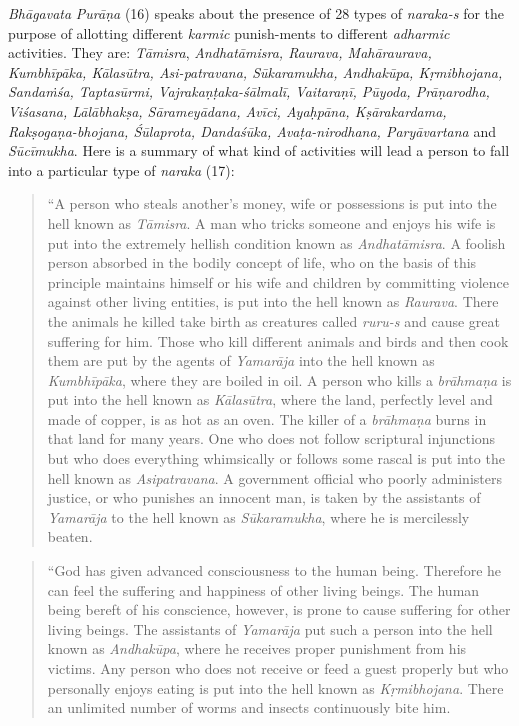\emph{Bhāgavata} \emph{Purāṇa} (16) speaks about the presence of 28 types of \emph{naraka-s} for the purpose of allotting different \emph{karmic} pun\-ish-\break ments to different \emph{adharmic} activities. They are: \emph{Tāmisra}, \emph{Andhatāmisra, Raurava, Mahāraurava, Kumbhīpāka, Kālasūtra, Asi-patra\-vana, Sūkaramukha, Andhakūpa, Kṛmibhojana, Sandaṁśa, Tapta\-sū\-rmi, Vajrakaṇṭaka-śālmalī, Vaitaraṇī, Pūyoda, Prāṇarodha, Viśasana, Lālābhakṣa, Sārameyādana, Avīci, Ayaḥpāna, Kṣārakardama, Rakṣo\-gaṇa-bhojana, Śūlaprota, Dandaśūka, Avaṭa-nirodhana, Paryāvartana} and \emph{Sūcīmukha}. Here is a summary of what kind of activities will lead a person to fall into a particular type of \emph{naraka} (17):

\begin{quote}
``A person who steals another's money, wife or possessions is put into the hell known as \emph{Tāmisra}. A man who tricks someone and enjoys his wife is put into the extremely hellish condition known as \emph{Andhatāmisra}. A foolish person absorbed in the bodily concept of life, who on the basis of this principle maintains himself or his wife and children by committing violence against other living entities, is put into the hell known as \emph{Raurava}. There the animals he killed take birth as creatures called \emph{ruru-s} and cause great suffering for him. Those who kill different animals and birds and then cook them are put by the agents of \emph{Yamarāja} into the hell known as \emph{Kumbhīpāka}, where they are boiled in oil. A person who kills a \emph{brāhmaṇa} is put into the hell known as \emph{Kālasūtra}, where the land, perfectly level and made of copper, is as hot as an oven. The killer of a \emph{brāhmaṇa} burns in that land for many years. One who does not follow scriptural injunctions but who does everything whimsically or follows some rascal is put into the hell known as \emph{Asipatravana}. A government official who poorly administers justice, or who punishes an innocent man, is taken by the assistants of \emph{Yamarāja} to the hell known as \emph{Sūkaramukha}, where he is mercilessly beaten.
\end{quote}

\begin{quote}
``God has given advanced consciousness to the human being. Therefore he can feel the suffering and happiness of other living beings. The human being bereft of his conscience, however, is prone to cause suffering for other living beings. The assistants of \emph{Yamarāja} put such a person into the hell known as \emph{Andhakūpa}, where he receives proper punishment from his victims. Any person who does not receive or feed a guest properly but who personally enjoys eating is put into the hell known as \emph{Kṛmibhojana}. There an unlimited number of worms and insects continuously bite him.
\end{quote}

